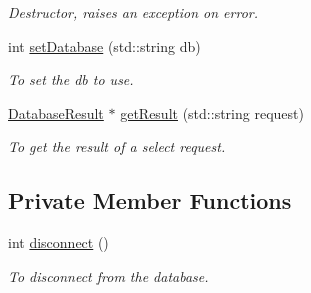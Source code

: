\begin{DoxyCompactItemize}
\begin{DoxyCompactList}\small\item\em Destructor, raises an exception on error. \item\end{DoxyCompactList}\item 
int \hyperlink{classOracleDatabase_a937a096b286c4e6738ea5d314aabe109}{setDatabase} (std::string db)
\begin{DoxyCompactList}\small\item\em To set the db to use. \item\end{DoxyCompactList}\item 
\hyperlink{classDatabaseResult}{DatabaseResult} $\ast$ \hyperlink{classOracleDatabase_a399070863f94605bc2e520c968e3edbe}{getResult} (std::string request)
\begin{DoxyCompactList}\small\item\em To get the result of a select request. \item\end{DoxyCompactList}\end{DoxyCompactItemize}
\subsection*{Private Member Functions}
\begin{DoxyCompactItemize}
\item 
int \hyperlink{classOracleDatabase_a9839467588dcecbdb4c4582903379346}{disconnect} ()
\begin{DoxyCompactList}\small\item\em To disconnect from the database. \item\end{DoxyCompactList}\end{DoxyCompactItemize}

